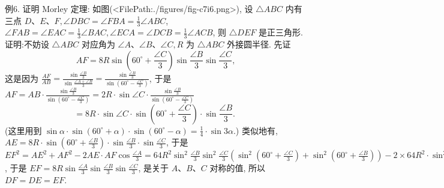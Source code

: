 例6. 证明 Morley 定理: 如图(<FilePath:./figures/fig-c7i6.png>), 设 $\triangle A B C$ 内有三点 $D 、 E 、 F, \angle D B C=\angle F B A=\frac{1}{3} \angle A B C$, $\angle F A B=\angle E A C=\frac{1}{3} \angle B A C, \angle E C A=\angle D C B= \frac{1}{3} \angle A C B$, 则 $\triangle D E F$ 是正三角形.
证明:不妨设 $\triangle A B C$ 对应角为 $\angle A 、 \angle B 、 \angle C, R$ 为 $\triangle A B C$ 外接圆半径.
先证
$$
A F=8 R \sin \left(60^{\circ}+\frac{\angle C}{3}\right) \sin \frac{\angle B}{3} \sin \frac{\angle C}{3},
$$
这是因为 $\frac{A F}{A B}=\frac{\sin \frac{\angle B}{3}}{\sin \frac{\angle A+\angle B}{3}}=\frac{\sin \frac{\angle B}{3}}{\sin \left(60^{\circ}-\frac{\angle C}{3}\right)}$,
于是 $A F=A B \cdot \frac{\sin \frac{\angle B}{3}}{\sin \left(60^{\circ}-\frac{\angle C}{3}\right)}=2 R \cdot \sin \angle C \cdot \frac{\sin \frac{\angle B}{3}}{\sin \left(60^{\circ}-\frac{\angle C}{3}\right)}$
$$
=8 R \cdot \sin \angle C \cdot \sin \left(60^{\circ}+\frac{\angle C}{3}\right) \cdot \sin \frac{\angle B}{3} \text {. }
$$
(这里用到 $\sin \alpha \cdot \sin \left(60^{\circ}+\alpha\right) \cdot \sin \left(60^{\circ}-\alpha\right)=\frac{1}{4} \cdot \sin 3 \alpha$.)
类似地有, $A E=8 R \cdot \sin \left(60^{\circ}+\frac{\angle B}{3}\right) \cdot \sin \frac{\angle B}{3} \cdot \sin \frac{\angle C}{3}$, 于是 $E F^2= A E^2+A F^2-2 A E \cdot A F \cos \frac{\angle A}{3}=64 R^2 \sin ^2 \frac{\angle B}{3} \sin ^2 \frac{\angle C}{3}\left(\sin ^2\left(60^{\circ}+\frac{\angle C}{3}\right)+\right. \left.\sin ^2\left(60^{\circ}+\frac{\angle B}{3}\right)\right)-2 \times 64 R^2 \cdot \sin ^2 \frac{\angle B}{3} \sin ^2 \frac{\angle C}{3} \sin \left(60^{\circ}+\frac{\angle B}{3}\right) \sin \left(60^{\circ}+\frac{\angle C}{3}\right) \cdot \cos \frac{\angle A}{3}=64 R^2 \sin ^2 \frac{\angle B}{3} \sin ^2 \frac{\angle C}{3}\left[\sin ^2\left(60^{\circ}+\frac{\angle C}{3}\right)+\sin ^2\left(60^{\circ}+\frac{\angle B}{3}\right)-\right. \left.2 \sin \left(60^{\circ}+\frac{\angle B}{3}\right) \cdot \sin \left(60^{\circ}+\frac{\angle C}{3}\right) \cdot \cos \frac{A}{3}\right]=64 R^2 \sin ^2 \frac{\angle B}{3} \sin ^2 \frac{\angle C}{3}[1+\left.\cos \frac{\angle A}{3} \cdot \cos \left(\frac{\angle C}{3}-\frac{\angle B}{3}\right)-2 \sin \left(60^{\circ}+\frac{\angle B}{3}\right) \sin \left(60^{\circ}+\frac{\angle C}{3}\right) \cos \frac{A}{3}\right]= 64 R^2 \sin ^2 \frac{\angle B}{3} \cdot \sin ^2 \frac{\angle C}{3}\left[1-\cos ^2 \frac{\angle A}{3}\right]=64 R^2 \sin ^2 \frac{\angle A}{3} \sin ^2 \frac{\angle B}{3} \sin ^2 \frac{\angle C}{3}$, 于是 $E F=8 R \sin \frac{\angle A}{3} \sin \frac{\angle B}{3} \sin \frac{\angle C}{3}$, 是关于 $A 、 B 、 C$ 对称的值, 所以 $D F= D E=E F$.



